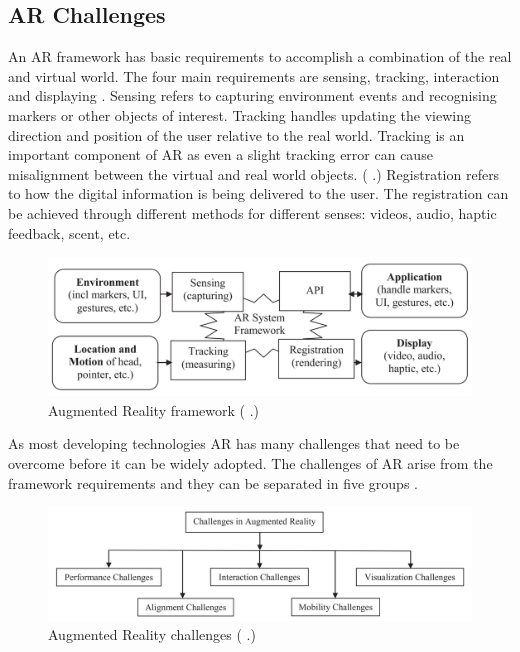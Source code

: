 \documentclass[12pt, a4paper,oneside, nocenter]{thesis}
\renewcommand{\citep}[1]{(\citeauthor{#1} \citeyear{#1}.)}
\begin{document}
\subsection{AR Challenges}
An AR framework has basic requirements to accomplish a combination of the real and virtual world.
The four main requirements are sensing, tracking, interaction and displaying . Sensing refers to
capturing environment events and recognising markers or other objects of interest. Tracking handles updating the
viewing direction and position of the user relative to the real world. Tracking is an important component
of AR as even a slight tracking error can cause misalignment between the virtual and real world objects. \citep{ar-design} 
Registration refers to how the digital information is being delivered to the user. The registration can be achieved
through different methods for different senses: videos, audio, haptic feedback, scent, etc.
\begin{figure}[H]
\includegraphics[width=\textwidth]{ar-framework}
\caption{Augmented Reality framework \citep{vrjournal}}
\label{fig:ar-framework}
\end{figure}
As most developing technologies AR has many challenges that need to be overcome before it can be widely adopted.
The challenges of AR arise from the framework requirements and they can be separated in five groups .
\begin{figure}[H]
\includegraphics[width=\textwidth]{ar-challenges}
\caption{Augmented Reality challenges \citep{Acta-Graphica}}
\label{fig:ar-challenges}
\end{figure}
\end{document}
